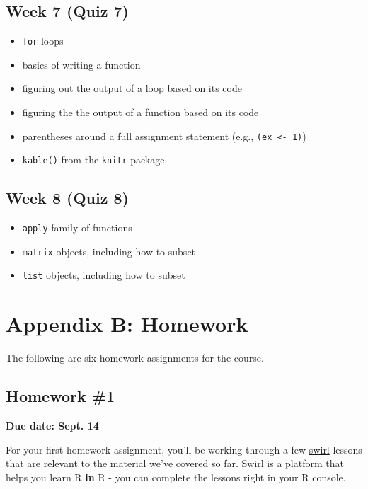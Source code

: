 \documentclass[]{book}
\providecommand{\tightlist}{%
  \setlength{\itemsep}{0pt}\setlength{\parskip}{0pt}}
\theoremstyle{definition}
\theoremstyle{definition}
\theoremstyle{definition}
\theoremstyle{remark}
\begin{document}
\section{Week 7 (Quiz 7)}\label{week-7-quiz-7}

\begin{itemize}
\tightlist
\item
  \texttt{for} loops
\item
  basics of writing a function
\item
  figuring out the output of a loop based on its code
\item
  figuring the the output of a function based on its code
\item
  parentheses around a full assignment statement (e.g.,
  \texttt{(ex\ \textless{}-\ 1)})
\item
  \texttt{kable()} from the \texttt{knitr} package
\end{itemize}

\section{Week 8 (Quiz 8)}\label{week-8-quiz-8}

\begin{itemize}
\tightlist
\item
  \texttt{apply} family of functions
\item
  \texttt{matrix} objects, including how to subset
\item
  \texttt{list} objects, including how to subset
\end{itemize}

\chapter{Appendix B: Homework}\label{appendix-b-homework}

The following are six homework assignments for the course.

\section{Homework \#1}\label{homework-1}

\textbf{Due date: Sept. 14}

For your first homework assignment, you'll be working through a few
\href{http://swirlstats.com/}{swirl} lessons that are relevant to the
material we've covered so far. Swirl is a platform that helps you learn
R \textbf{in} R - you can complete the lessons right in your R console.
\end{document}
